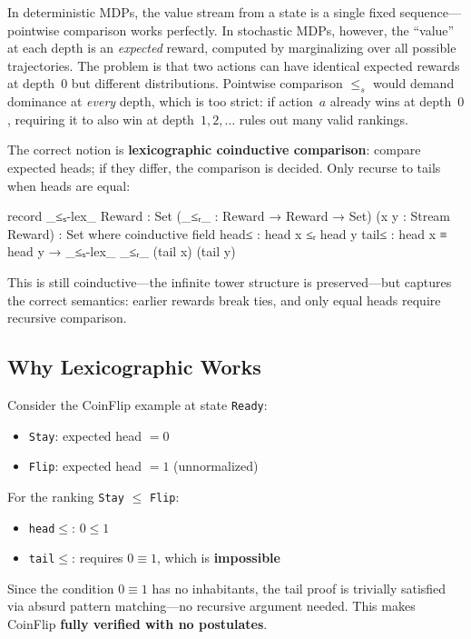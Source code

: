 \documentclass[9pt,a4paper]{article}
\theoremstyle{plain}
\theoremstyle{definition}
\theoremstyle{remark}
\begin{document}
In deterministic MDPs, the value stream from a state is a single fixed sequence---pointwise comparison works perfectly.  In stochastic MDPs, however, the ``value'' at each depth is an \emph{expected} reward, computed by marginalizing over all possible trajectories.  The problem is that two actions can have identical expected rewards at depth~$0$ but different distributions.  Pointwise comparison $\le_s$ would demand dominance at \emph{every} depth, which is too strict: if action~$a$ already wins at depth~$0$, requiring it to also win at depth~$1, 2, \ldots$ rules out many valid rankings.

The correct notion is \textbf{lexicographic coinductive comparison}: compare expected heads; if they differ, the comparison is decided.  Only recurse to tails when heads are equal:

\begin{code}
  record _≤ₛ-lex_ {Reward : Set} (_≤ᵣ_ : Reward → Reward → Set) 
                  (x y : Stream Reward) : Set where
    coinductive
    field
      head≤ : head x ≤ᵣ head y
      tail≤ : head x ≡ head y → _≤ₛ-lex_ _≤ᵣ_ (tail x) (tail y)
\end{code}

\noindent This is still coinductive---the infinite tower structure is preserved---but captures the correct semantics: earlier rewards break ties, and only equal heads require recursive comparison.

\subsection{Why Lexicographic Works}

Consider the CoinFlip example at state \texttt{Ready}:
\begin{itemize}
\item \texttt{Stay}: expected head $= 0$
\item \texttt{Flip}: expected head $= 1$ (unnormalized)
\end{itemize}

\noindent For the ranking \texttt{Stay} $\le$ \texttt{Flip}:
\begin{itemize}
\item \texttt{head$\le$}: $0 \le 1$ \checkmark
\item \texttt{tail$\le$}: requires $0 \equiv 1$, which is \textbf{impossible}
\end{itemize}

\noindent Since the condition $0 \equiv 1$ has no inhabitants, the tail proof is trivially satisfied via absurd pattern matching---no recursive argument needed.  This makes CoinFlip \textbf{fully verified with no postulates}.
\end{document}
